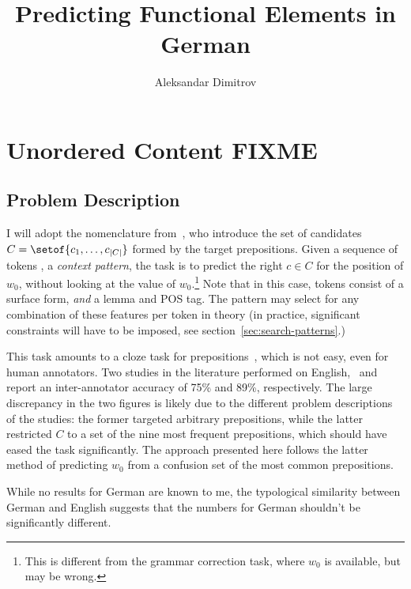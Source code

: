\documentclass[12pt]{article}
\author{Aleksandar Dimitrov}
\title{Predicting Functional Elements in German}
\begin{document}


\maketitle

\tableofcontents

\section{Unordered Content FIXME}

\subsection{Problem Description}


I will adopt the nomenclature from~\citet{bergsmaETAL2009}, who introduce the
set of candidates $C=\setof{c_1,\ldots,c_{|C|}}$ formed by the target
prepositions. Given a sequence of tokens
, a \emph{context pattern}, the
task is to predict the right $c\in C$ for the position of $w_0$, without looking
at the value of $w_0$.\footnote{This is different from the grammar correction
  task, where $w_0$ is available, but may be wrong.} 
Note that in this case, tokens consist of a
surface form, \emph{and} a lemma and POS tag. The pattern may select for any
combination of these features per token in theory (in practice, significant
constraints will have to be imposed, see section~\ref{sec:search-patterns}.)

This task amounts to a cloze task for prepositions~\citep{taylor1953}, which is
not easy, even for human annotators. Two studies in the literature performed on
English,~\citet{tetreaultchodorow2008} and~\citet{defelice2008} report an
inter-annotator accuracy of 75\% and 89\%, respectively. The large discrepancy
in the two figures is likely due to the different problem descriptions of the
studies: the former targeted arbitrary prepositions, while the latter restricted
$C$ to a set of the nine most frequent prepositions, which should have eased the
task significantly.  The approach presented here follows the latter method of
predicting $w_0$ from a confusion set of the most common prepositions.

While no results for German are known to me, the typological similarity between
German and English suggests that the numbers for German shouldn't be
significantly different.
\end{document}
